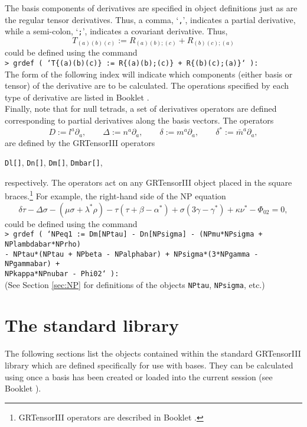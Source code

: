 \documentclass{article}
\begin{document}
The basis components of derivatives are specified in object
definitions just as are the regular tensor derivatives. Thus, a comma,
`\texttt{,}', indicates a partial derivative, while a semi-colon,
`\texttt{;}', indicates a covariant derivative. Thus,
\[
  T_{(a)(b)(c)} := R_{(a)(b);(c)} + R_{(b)(c);(a)}
\]
could be defined using the command\\

\noindent\texttt{> grdef (
  `T\{(a)(b)(c)\} := R\{(a)(b);(c)\} + R\{(b)(c);(a)\}` ):}\\

\noindent The form of the following index will indicate which 
components (either basis or tensor) of the derivative are to be
calculated. The operations specified by each type of derivative are
listed in Booklet \grDefRef.\\

Finally, note that for null tetrads, a set of derivatives operators
are defined corresponding to partial derivatives along the basis
vectors. The operators
\[
  D := l^a\partial_a, \qquad \Delta := n^a\partial_a, \qquad
  \delta := m^a\partial_a, \qquad \delta^* := \bar{m}^a\partial_a,
\]
are defined by the GRTensorIII operators
\begin{center}
  \texttt{Dl[]}, \qquad \texttt{Dn[]}, \qquad \texttt{Dm[]}, \qquad
  \texttt{Dmbar[]},
\end{center}
respectively. The operators act on any GRTensorIII object placed in
the square braces.\footnote{GRTensorIII operators are described in
Booklet \grCalcRef.} For example, the right-hand side of the
NP equation
\[
  \delta\tau - \Delta\sigma - (\mu\sigma + \lambda^*\rho)
    - \tau (\tau+\beta-\alpha^*) + \sigma (3\gamma-\gamma^*)
    + \kappa\nu^* - \Phi_{02} = 0,
\]
could be defined using the command\\

\noindent\texttt{> grdef ( `NPeq1 := Dm[NPtau] - Dn[NPsigma]
  - (NPmu*NPsigma + NPlambdabar*NPrho) \\
  \indent - NPtau*(NPtau + NPbeta - NPalphabar)
  + NPsigma*(3*NPgamma - NPgammabar) + \\
  \indent NPkappa*NPnubar - Phi02` ):}\\

\noindent (See Section \ref{sec:NP} for definitions of the objects
\texttt{NPtau}, \texttt{NPsigma}, etc.)
%
\section{The standard library} \label{sec:lib}
%
The following sections list the objects contained within the standard
GRTensorIII library which are defined specifically for use with bases.
They can be calculated using  once a basis has been
created or loaded into the current session (see Booklet \grMakegRef).
\end{document}
